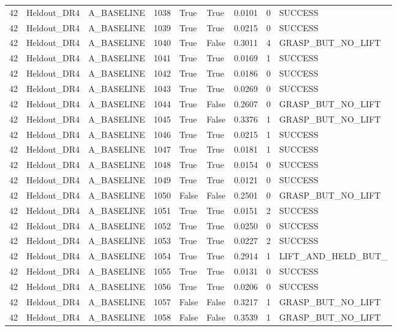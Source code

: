 \documentclass[11pt,a4paper,oneside]{book}
\begin{document}
\begin{longtable}{l l l l l l l l l}
42 & Heldout\_DR4 & A\_BASELINE & 1038 & True & True & 0.0101 & 0 & SUCCESS \\
42 & Heldout\_DR4 & A\_BASELINE & 1039 & True & True & 0.0215 & 0 & SUCCESS \\
42 & Heldout\_DR4 & A\_BASELINE & 1040 & True & False & 0.3011 & 4 & GRASP\_BUT\_NO\_LIFT \\
42 & Heldout\_DR4 & A\_BASELINE & 1041 & True & True & 0.0169 & 1 & SUCCESS \\
42 & Heldout\_DR4 & A\_BASELINE & 1042 & True & True & 0.0186 & 0 & SUCCESS \\
42 & Heldout\_DR4 & A\_BASELINE & 1043 & True & True & 0.0269 & 0 & SUCCESS \\
42 & Heldout\_DR4 & A\_BASELINE & 1044 & True & False & 0.2607 & 0 & GRASP\_BUT\_NO\_LIFT \\
42 & Heldout\_DR4 & A\_BASELINE & 1045 & True & False & 0.3376 & 1 & GRASP\_BUT\_NO\_LIFT \\
42 & Heldout\_DR4 & A\_BASELINE & 1046 & True & True & 0.0215 & 1 & SUCCESS \\
42 & Heldout\_DR4 & A\_BASELINE & 1047 & True & True & 0.0181 & 1 & SUCCESS \\
42 & Heldout\_DR4 & A\_BASELINE & 1048 & True & True & 0.0154 & 0 & SUCCESS \\
42 & Heldout\_DR4 & A\_BASELINE & 1049 & True & True & 0.0121 & 0 & SUCCESS \\
42 & Heldout\_DR4 & A\_BASELINE & 1050 & False & False & 0.2501 & 0 & GRASP\_BUT\_NO\_LIFT \\
42 & Heldout\_DR4 & A\_BASELINE & 1051 & True & True & 0.0151 & 2 & SUCCESS \\
42 & Heldout\_DR4 & A\_BASELINE & 1052 & True & True & 0.0250 & 0 & SUCCESS \\
42 & Heldout\_DR4 & A\_BASELINE & 1053 & True & True & 0.0227 & 2 & SUCCESS \\
42 & Heldout\_DR4 & A\_BASELINE & 1054 & True & True & 0.2914 & 1 & LIFT\_AND\_HELD\_BUT\_ \\
42 & Heldout\_DR4 & A\_BASELINE & 1055 & True & True & 0.0131 & 0 & SUCCESS \\
42 & Heldout\_DR4 & A\_BASELINE & 1056 & True & True & 0.0206 & 0 & SUCCESS \\
42 & Heldout\_DR4 & A\_BASELINE & 1057 & False & False & 0.3217 & 1 & GRASP\_BUT\_NO\_LIFT \\
42 & Heldout\_DR4 & A\_BASELINE & 1058 & False & False & 0.3539 & 1 & GRASP\_BUT\_NO\_LIFT \\

\end{longtable}
\end{document}
